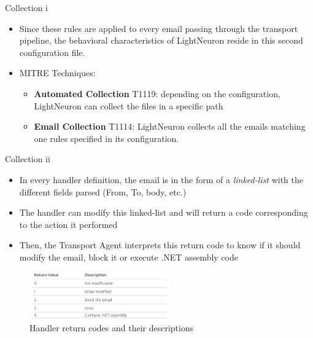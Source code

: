 \begin{frame}[fragile]{Collection i}
    \begin{itemize}
        \item Since these rules are applied to every email passing through the transport pipeline, the behavioral characteristics
        of LightNeuron reside in this second configuration file.
        \item MITRE Techniques:
            \begin{itemize}
                \item[] \textbf{Automated Collection} T1119: depending on the configuration, LightNeuron
                can collect the files in a specific path
                \item[] \textbf{Email Collection} T1114: LightNeuron collects all the emails matching 
                one rules specified in its configuration.
            \end{itemize}
    \end{itemize}
\end{frame}

\begin{frame}[fragile]{Collection ii}
    \begin{itemize}
        \item  In every handler definition, the email is in the form
        of a \emph{linked-list} with the different fields parsed (From, To, body, etc.)
        \item The handler can modify this linked-list
        and will return a code corresponding to the action it performed
        \item Then, the Transport Agent interprets this return code to know if it should modify the email, block
        it or execute .NET assembly code
    \end{itemize}
    \begin{figure}
        \includegraphics[width=6cm]{figures/return.PNG}
        \caption{Handler return codes and their descriptions}
    \end{figure}
\end{frame}


